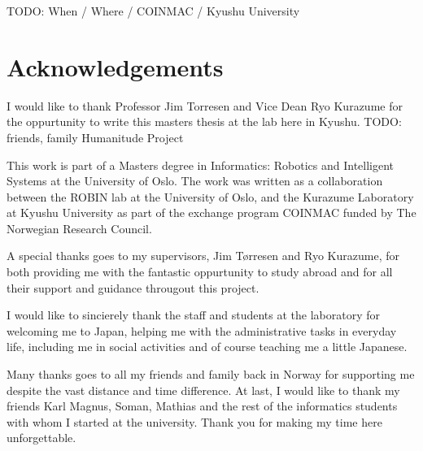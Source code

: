 TODO: When / Where / COINMAC / Kyushu University

\section*{Acknowledgements}

I would like to thank Professor Jim Torresen and Vice Dean Ryo Kurazume for the oppurtunity to write this masters thesis at the lab here in Kyushu.
TODO: friends, family
Humanitude Project~\cite{hindawi2016case}

This work is part of a Masters degree in Informatics: Robotics and Intelligent Systems at the University of Oslo. The work was written as a collaboration between the ROBIN lab at the University of Oslo, and the Kurazume Laboratory at Kyushu University as part of the exchange program COINMAC funded by The Norwegian Research Council.

A special thanks goes to my supervisors, Jim Tørresen and Ryo Kurazume, for both providing me with the fantastic oppurtunity to study abroad and for all their support and guidance througout this project.

I would like to sincierely thank the staff and students at the laboratory for welcoming me to Japan, helping me with the administrative tasks in everyday life, including me in social activities and of course teaching me a little Japanese.

Many thanks goes to all my friends and family back in Norway for supporting me despite the vast distance and time difference.
At last, I would like to thank my friends Karl Magnus, Soman, Mathias and the rest of the informatics students with whom I started at the university. Thank you for making my time here unforgettable. 

